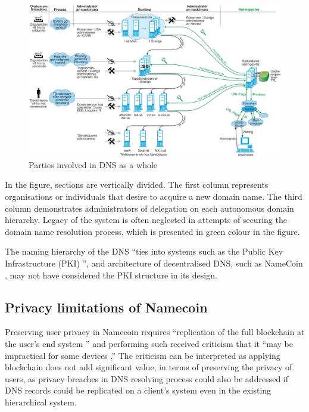 \begin{figure}[h!]
    \begin{center}
    \includegraphics*[width=1\columnwidth]{img/DNS-maskinvara}
    \end{center}
    \caption{Parties involved in DNS as a whole \cite{SUNET-DNS}}
    \label{dnsactors}
\end{figure}

In the figure, sections are vertically divided.
The first column represents organisations or individuals that desire to acquire a new domain name.
The third column demonstrates administrators of delegation on each autonomous domain hierarchy.
Legacy of the system is often neglected in attempts of securing the domain name resolution process, which is presented in green colour in the figure. 

The naming hierarchy of the DNS ``ties into systems such as the Public Key Infrastructure (PKI) \cite{akamai-dns-architecture}'', and architecture of decentralised DNS, such as NameCoin \cite{loibl2014namecoin}, may not have considered the PKI structure in its design.

\subsection{Privacy limitations of Namecoin}
Preserving user privacy in Namecoin requires ``replication of the full blockchain at the user's end system \cite{grothoff2017nsa}'' and performing such received criticism that it ``may be impractical for some devices \cite{grothoff2017nsa}.''
The criticism can be interpreted as applying blockchain does not add significant value, in terms of preserving the privacy of users, as privacy breaches in DNS resolving process could also be addressed if DNS records could be replicated on a client's system even in the existing hierarchical system. 

